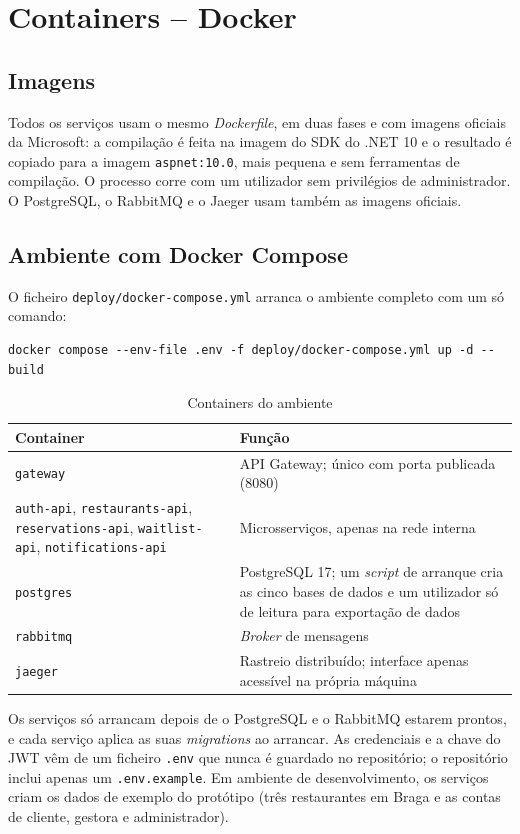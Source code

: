 \chapter{Containers -- Docker}
\label{cap:implantacao}

\section{Imagens}

Todos os serviços usam o mesmo \textit{Dockerfile}, em duas fases e com imagens oficiais da
Microsoft: a compilação é feita na imagem do SDK do .NET 10 e o resultado é copiado para a imagem
\texttt{aspnet:10.0}, mais pequena e sem ferramentas de compilação. O processo corre com um
utilizador sem privilégios de administrador. O PostgreSQL, o RabbitMQ e o Jaeger usam também as
imagens oficiais.

\section{Ambiente com Docker Compose}

O ficheiro \texttt{deploy/docker-compose.yml} arranca o ambiente completo com um só comando:

\begin{verbatim}
docker compose --env-file .env -f deploy/docker-compose.yml up -d --build
\end{verbatim}

\begin{table}[H]
\centering
\small
\renewcommand{\arraystretch}{1.2}
\begin{tabularx}{\textwidth}{>{\raggedright\arraybackslash}p{} X}
\toprule
\textbf{Container} & \textbf{Função} \\
\midrule
\texttt{gateway} & API Gateway; único com porta publicada (8080) \\
\texttt{auth-api}, \texttt{restaurants-api}, \texttt{reservations-api}, \texttt{waitlist-api}, \texttt{notifications-api}
& Microsserviços, apenas na rede interna \\
\texttt{postgres}
& PostgreSQL 17; um \textit{script} de arranque cria as cinco bases de dados e um utilizador só de leitura para exportação de dados \\
\texttt{rabbitmq}
& \textit{Broker} de mensagens \\
\texttt{jaeger}
& Rastreio distribuído; interface apenas acessível na própria máquina \\
\bottomrule
\end{tabularx}
\caption{Containers do ambiente}
\label{tab:containeres}
\end{table}

Os serviços só arrancam depois de o PostgreSQL e o RabbitMQ estarem prontos, e cada serviço aplica as suas \textit{migrations} ao arrancar. As credenciais e a
chave do JWT vêm de um ficheiro \texttt{.env} que nunca é guardado no repositório; o repositório
inclui apenas um \texttt{.env.example}. Em ambiente de desenvolvimento, os serviços criam os dados de
exemplo do protótipo (três restaurantes em Braga e as contas de cliente, gestora e administrador).
